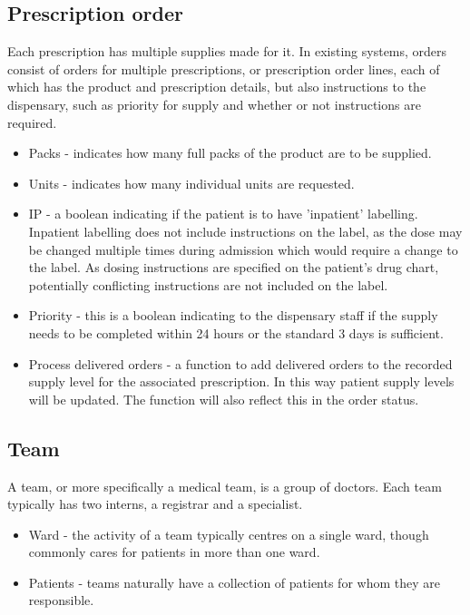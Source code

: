 \documentclass[letterpaper]{amsart}
\begin{document}
\subsection{Prescription order}
Each prescription has multiple supplies made for it.  In existing systems, orders consist of orders for multiple prescriptions, or prescription order lines, each of which has the product and prescription details, but also instructions to the dispensary, such as priority for supply and whether or not instructions are required.
\begin{itemize}
    \item Packs - indicates how many full packs of the product are to be supplied. 
    \item Units - indicates how many individual units are requested. 
    \item IP - a boolean indicating if the patient is to have 'inpatient' labelling.  Inpatient labelling does not include instructions on the label, as the dose may be changed multiple times during admission which would require a change to the label. As dosing instructions are specified on the patient's drug chart, potentially conflicting instructions are not included on the label.
    \item Priority - this is a boolean indicating to the dispensary staff if the supply needs to be completed within 24 hours or the standard 3 days is sufficient. 
    \item Process delivered orders - a function to add delivered orders to the recorded supply level for the associated prescription.  In this way patient supply levels will be updated.  The function will also reflect this in the order status.
\end{itemize}
\subsection{Team}
A team, or more specifically a medical team, is a group of doctors.  Each team typically has two interns, a registrar and a specialist. 
\begin{itemize}
    \item Ward - the activity of a team typically centres on a single ward, though commonly cares for patients in more than one ward. 
    \item Patients - teams naturally have a collection of patients for whom they are responsible.
\end{itemize}
\end{document}
